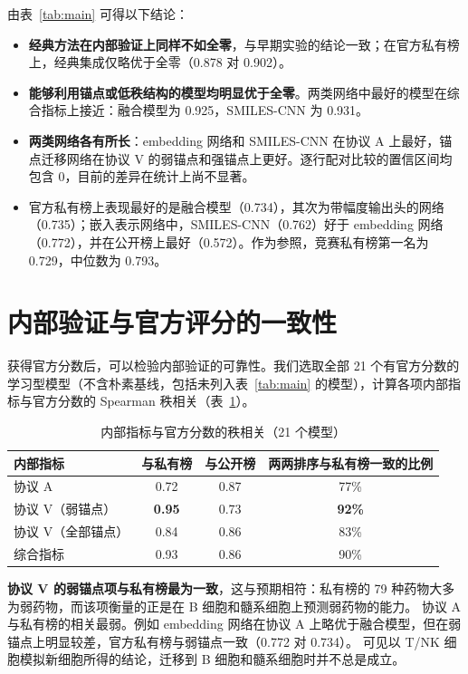\documentclass[11pt,a4paper]{article}
\begin{document}
由表~\ref{tab:main} 可得以下结论：
\begin{itemize}
\item \textbf{经典方法在内部验证上同样不如全零}，与早期实验的结论一致；在官方私有榜上，经典集成仅略优于全零（0.878 对 0.902）。
\item \textbf{能够利用锚点或低秩结构的模型均明显优于全零}。两类网络中最好的模型在综合指标上接近：融合模型为 0.925，SMILES-CNN 为 0.931。
\item \textbf{两类网络各有所长}：embedding 网络和 SMILES-CNN 在协议 A 上最好，锚点迁移网络在协议 V 的弱锚点和强锚点上更好。逐行配对比较的置信区间均包含 0，目前的差异在统计上尚不显著。
\item 官方私有榜上表现最好的是融合模型（0.734），其次为带幅度输出头的网络（0.735）；嵌入表示网络中，SMILES-CNN（0.762）好于 embedding 网络（0.772），并在公开榜上最好（0.572）。作为参照，竞赛私有榜第一名为 0.729，中位数为 0.793。
\end{itemize}

\section{内部验证与官方评分的一致性}

获得官方分数后，可以检验内部验证的可靠性。我们选取全部 21 个有官方分数的学习型模型（不含朴素基线，包括未列入表~\ref{tab:main} 的模型），计算各项内部指标与官方分数的 Spearman 秩相关（表~\ref{tab:corr}）。

\begin{table}[!ht]
\centering\small
\caption{内部指标与官方分数的秩相关（21 个模型）}\label{tab:corr}
\begin{tabular}{@{}lccc@{}}
\toprule
内部指标 & 与私有榜 & 与公开榜 & 两两排序与私有榜一致的比例 \\
\midrule
协议 A & 0.72 & 0.87 & 77\% \\
协议 V（弱锚点） & \textbf{0.95} & 0.73 & \textbf{92\%} \\
协议 V（全部锚点） & 0.84 & 0.86 & 83\% \\
综合指标 & 0.93 & 0.86 & 90\% \\
\bottomrule
\end{tabular}
\end{table}

\textbf{协议 V 的弱锚点项与私有榜最为一致}，这与预期相符：私有榜的 79 种药物大多为弱药物，而该项衡量的正是在 B 细胞和髓系细胞上预测弱药物的能力。
协议 A 与私有榜的相关最弱。例如 embedding 网络在协议 A 上略优于融合模型，但在弱锚点上明显较差，官方私有榜与弱锚点一致（0.772 对 0.734）。
可见以 T/NK 细胞模拟新细胞所得的结论，迁移到 B 细胞和髓系细胞时并不总是成立。
\end{document}
